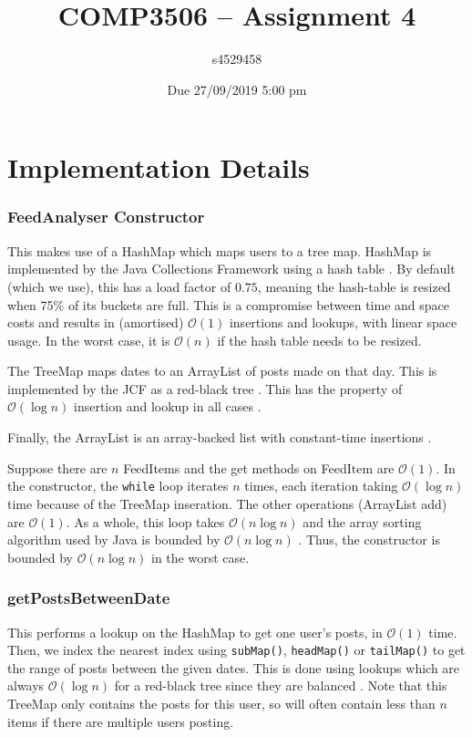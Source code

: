 \documentclass[11pt,a4paper]{article} %
\author{s4529458}
\date{{Due 27/09/2019 5:00 pm}}
\title{COMP3506 -- Assignment 4}
\begin{document}
%

\setcounter{page}{1}
\maketitle

\part*{Implementation Details}
\section*{FeedAnalyser Constructor}
This makes use of a HashMap which maps users to a tree map.
HashMap is implemented by the Java Collections Framework using a
hash table \cite{hashmap}. By default (which we use), this has a load factor of $0.75$,
meaning the hash-table is resized when 75\% of its buckets are full.
This is a compromise between time and space costs and results in 
(amortised) $\mathcal O(1)$ insertions and lookups, with linear space usage.
In the worst case, it is $\mathcal O(n)$ if the hash table needs to be 
resized.

The TreeMap maps dates to an ArrayList of posts made on that day.
This is implemented by the JCF as a red-black tree \cite{treemap}. 
This has the property of 
$\mathcal O(\log n)$ insertion and lookup in all cases \cite{clrs}.

Finally, the ArrayList is an array-backed list with constant-time insertions \cite{arraylist}.

Suppose there are $n$ FeedItems and the get methods on FeedItem are $\mathcal O(1)$.
In the constructor, the \verb|while| loop iterates $n$ times, 
each iteration taking $\mathcal O(\log n)$ time because of the 
TreeMap inseration. The other operations (ArrayList add) are $\mathcal O(1)$.
As a whole, this loop takes $\mathcal O(n \log n)$ and the array sorting algorithm used by 
Java is bounded by $\mathcal O(n \log n)$ \cite{sort}.
Thus, the constructor is bounded by
$\mathcal O(n \log n)$ in the worst case.

\section*{getPostsBetweenDate}
This performs a lookup on the HashMap to get one user's posts, 
in $\mathcal O(1)$ time.
Then, we index the nearest index using \verb|subMap()|, \verb|headMap()|
or \verb|tailMap()| to get the range of posts between the given dates. 
This is done using lookups which are always $\mathcal O(\log n)$ 
for a red-black tree since they are balanced \cite{redblack}. Note that 
this TreeMap only contains the posts for this user, so will often contain 
less than $n$ items if there are multiple users posting.
\end{document}

